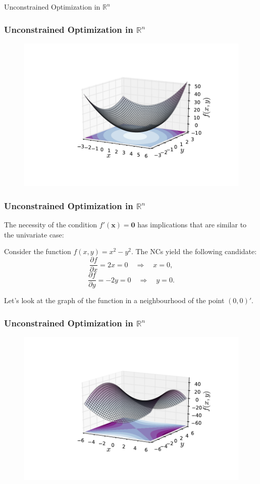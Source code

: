 \documentclass[10pt]{beamer}
\theoremstyle{definition}
\begin{document}
\begin{section}{Unconstrained Optimization in $ \mathbb{R}^n $}
\begin{frame}[fragile]
\frametitle{Unconstrained Optimization in $ \mathbb{R}^n $}
\begin{figure}
\centering
\includegraphics[width=0.9\linewidth]{quadformplot}
\label{fig:quadformplot}
\end{figure}
\end{frame}

\begin{frame}[fragile]
\frametitle{Unconstrained Optimization in $ \mathbb{R}^n $}
The necessity of the condition $  f'(\mathbf{x}) = \mathbf{0} $ has implications that are similar to the univariate case:

\begin{example}
Consider the function $ f(x,y) = x^2 - y^2 $. The NCs yield the following candidate: \[ \frac{\partial f}{\partial x} = 2x = 0\quad \Rightarrow \quad x=0, \]
\[ \frac{\partial f}{\partial y} = -2y = 0\quad \Rightarrow \quad y = 0.\] \bigskip

Let's look at the graph of the function in a neighbourhood of the point $ (0,0)' $.
\label{ex:saddle}
\end{example}
\end{frame}

\begin{frame}[fragile]
\frametitle{Unconstrained Optimization in $ \mathbb{R}^n $}
\begin{figure}
\centering
\includegraphics[width=0.9\linewidth]{saddlepoint}
\label{fig:saddlepoint}
\end{figure}
\end{frame}


\end{section}
\end{document}
